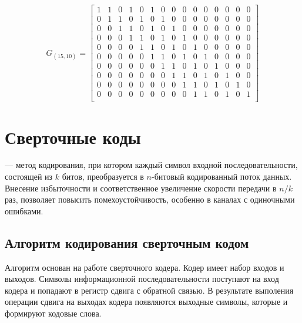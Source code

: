 \setcounter{MaxMatrixCols}{15}
\begin{equation}
G_{(15, 10)} =
\begin{bmatrix}
1 & 1 & 0 & 1 & 0 & 1 & 0 & 0 & 0 & 0 & 0 & 0 & 0 & 0 & 0\\
0 & 1 & 1 & 0 & 1 & 0 & 1 & 0 & 0 & 0 & 0 & 0 & 0 & 0 & 0\\
0 & 0 & 1 & 1 & 0 & 1 & 0 & 1 & 0 & 0 & 0 & 0 & 0 & 0 & 0\\
0 & 0 & 0 & 1 & 1 & 0 & 1 & 0 & 1 & 0 & 0 & 0 & 0 & 0 & 0\\
0 & 0 & 0 & 0 & 1 & 1 & 0 & 1 & 0 & 1 & 0 & 0 & 0 & 0 & 0\\
0 & 0 & 0 & 0 & 0 & 1 & 1 & 0 & 1 & 0 & 1 & 0 & 0 & 0 & 0\\
0 & 0 & 0 & 0 & 0 & 0 & 1 & 1 & 0 & 1 & 0 & 1 & 0 & 0 & 0\\
0 & 0 & 0 & 0 & 0 & 0 & 0 & 1 & 1 & 0 & 1 & 0 & 1 & 0 & 0\\
0 & 0 & 0 & 0 & 0 & 0 & 0 & 0 & 1 & 1 & 0 & 1 & 0 & 1 & 0\\
0 & 0 & 0 & 0 & 0 & 0 & 0 & 0 & 0 & 1 & 1 & 0 & 1 & 0 & 1\\
\end{bmatrix}
\end{equation}

\section{Сверточные коды}

\begin{definition} 
 --- метод кодирования, при котором каждый символ входной последовательности, 
состоящей из $k$ битов, преобразуется в $n$-битовый кодированный поток данных. Внесение избыточности и 
соответственное увеличение скорости передачи в $n/k$ раз, позволяет повысить помехоустойчивость, особенно в 
каналах с одиночными ошибками.
\end{definition}

\subsection{Алгоритм кодирования сверточным кодом}
Алгоритм основан на работе сверточного кодера. Кодер имеет набор входов и выходов. Символы информационной
последовательности поступают на вход кодера и попадают в регистр сдвига с обратной связью. В результате
выполения операции сдвига на выходах кодера появляются выходные символы, которые и формируют кодовые слова.

